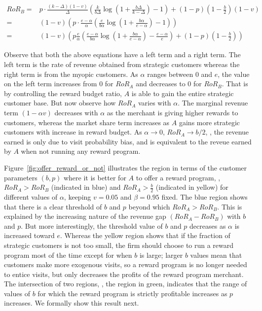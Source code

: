 \begin{align*}
RoR_B =& p\cdot\frac{(k-\Delta)(1-v)}{\Delta}\left(\frac{k}{b\Delta}\log\left(1+\frac{b\Delta}{k-\Delta}\right) - 1\right) + (1-p)(1-\frac{b}{2})(1-v)\\
      =& (1-v)\left(p\cdot\frac{e-\alpha}{\alpha}\left(\frac{e}{b\alpha}\log\left(1+\frac{b\alpha}{e-\alpha}\right) - 1\right)\right)\\
      =& (1-v)\left(p\frac{e}{\alpha}\left(\frac{e-\alpha}{b\alpha}\log\left(1+\frac{b\alpha}{e-\alpha}\right) - \frac{e-\alpha}{e}\right) + (1-p)(1-\frac{b}{2})\right)
\end{align*}

Observe that both the above equations have a left term and a right term. The left term is the rate of revenue obtained from strategic customers whereas the right term is from the myopic customers.
As $\alpha$ ranges between $0$ and $e$, the value on the left term increases from $0$ for $RoR_A$ and decreases to $0$ for $RoR_B$.
That is by controlling the reward budget ratio, $A$ is able to gain the entire strategic customer base.
But now observe how $RoR_A$ varies with $\alpha$.
The marginal revenue term $(1-\alpha v)$ decreases with $\alpha$ as the merchant is giving higher rewards to customers, whereas the market share term increases as $A$ gains more strategic customers with increase in reward budget.
As $\alpha \to 0$, $RoR_A \to b/2$, \ie, the revenue earned is only due to visit probability bias, and is equivalent to the reveue earned by $A$ when not running any reward program.

Figure~\ref{fig:offer_reward_or_not} illustrates the region in terms of the customer parameters $(b,p)$ where it is better for $A$ to offer a reward program, \ie, $RoR_A > RoR_B$ (indicated in blue) and $RoR_A > \frac{b}{2}$ (indicated in yellow) for different values of $\alpha$, keeping $v = 0.05$ and $\beta = 0.95$ fixed.
The blue region shows that there is a clear threshold of $b$ and $p$ beyond which $RoR_A > RoR_B$.
This is explained by the increasing nature of the revenue gap $(RoR_A - RoR_B)$ with $b$ and $p$.
But more interestingly, the threshold value of $b$ and $p$ decreases as $\alpha$ is increased toward $e$.
Whereas the yellow region shows that if the fraction of strategic customers is not too small, the firm should choose to run a reward program most of the time except for when $b$ is large; larger $b$ values mean that customers make more exogenous visits, so a reward program is no longer needed to entice visits, but only decreases the profits of the reward program merchant.
The intersection of two regions, \ie, the region in green, indicates that the range of values of $b$ for which the reward program is strictly profitable increases as $p$ increases.
We formally show this result next.

